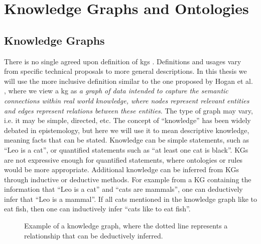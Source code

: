 \chapter{Knowledge Graphs and Ontologies}


\section{Knowledge Graphs}
There is no single agreed upon definition of \glspl{kg} \cite{bergman_2019, bonatti2019knowledge, ehrlinger2016towards}. Definitions and usages vary from specific technical proposals to more general descriptions. In this thesis we will use the more inclusive definition similar to the one proposed by Hogan et al. \cite{hogan2020knowledge}, where we view a \gls{kg} as \textit{a graph of data intended to capture the semantic connections within real world knowledge, where nodes represent relevant entities and edges represent relations between these entities}. The type of graph may vary, i.e. it may be simple, directed, etc. The concept of ``knowledge'' has been widely debated in epistemology, but here we will use it to mean descriptive knowledge, meaning facts that can be stated. Knowledge can be simple statements, such as ``Leo is a cat'', or quantified statements such as ``at least one cat is black''. KGs are not expressive enough for quantified statements, where ontologies or rules would be more appropriate. Additional knowledge can be inferred from KGs through inductive or deductive methods. For example from a KG containing the information that ``Leo is a cat'' and ``cats are mammals'', one can deductively infer that ``Leo is a mammal''. If all cats mentioned in the knowledge graph like to eat fish, then one can inductively infer ``cats like to eat fish''.


\begin{figure}
\centering
{}

\caption{Example of a knowledge graph, where the dotted line represents a relationship that can be deductively inferred.} \label{fig:KGexample}
\end{figure}


